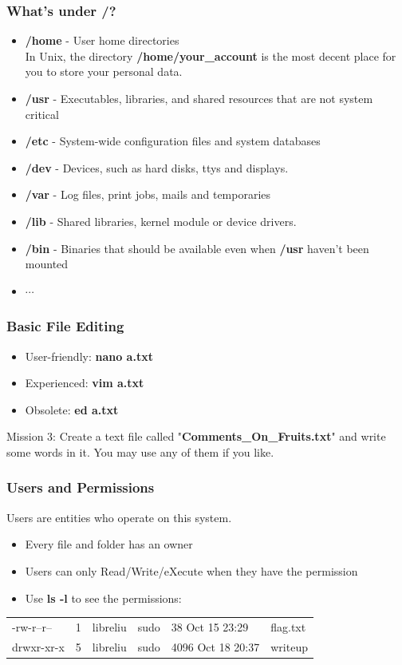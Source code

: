 \documentclass[11pt]{beamer}
\begin{document}
\begin{frame}
\frametitle{What's under \textbf{/}?}
\begin{itemize}
\item \textbf{/home} - User home directories\\
In Unix, the directory \textbf{/home/your\_account} is the most decent place for you to store your personal data.
\item \textbf{/usr} - Executables, libraries, and shared resources that are not system critical
\item \textbf{/etc} - System-wide configuration files and system databases
\item \textbf{/dev} - Devices, such as hard disks, ttys and displays.
\item \textbf{/var} - Log files, print jobs, mails and temporaries
\item \textbf{/lib} - Shared libraries, kernel module or device drivers.
\item \textbf{/bin} - Binaries that should be available even when \textbf{/usr} haven't been mounted
\item $\cdots$
\end{itemize}
\end{frame}

\begin{frame}
\frametitle{Basic File Editing}
\begin{itemize}
\item User-friendly: \textbf{nano a.txt}
\item Experienced: \textbf{vim a.txt}
\item Obsolete: \textbf{ed a.txt}
\end{itemize}
Mission 3: Create a text file called "\textbf{Comments\_On\_Fruits.txt}" and write some words in it. You may use any of them if you like.
\end{frame}

\begin{frame}
\frametitle{Users and Permissions}
Users are entities who operate on this system.
\begin{itemize}
\item Every file and folder has an owner
\item Users can only Read/Write/eXecute when they have the permission
\item Use \textbf{ls -l} to see the permissions:\\
\end{itemize}
\begin{tabular}{llllll}
-rw-r--r-- & 1 & libreliu & sudo  &        38 Oct 15 23:29 & flag.txt\\
drwxr-xr-x &  5  & libreliu & sudo &       4096 Oct 18 20:37 & writeup\\
\end{tabular}


\end{frame}
\end{document}
